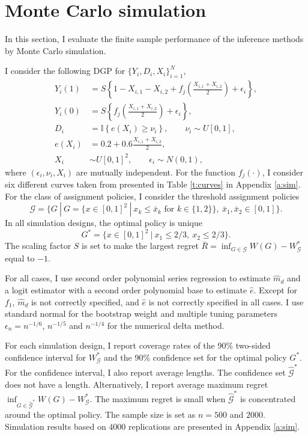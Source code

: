 \documentclass[12pt,oneside,reqno,english]{amsart}
\theoremstyle{definition}
\begin{document}
\section{Monte Carlo simulation}\label{sim}
In this section, I evaluate the finite sample performance of the inference methods by Monte Carlo simulation. 

I consider the following DGP for $\{Y_{i},D_{i},X_{i}\}_{i=1}^{N}$, 
\begin{align*}
Y_{i}(1) & =  S\left\{1-X_{i,1}-X_{i,2}+f_{j}\left(\frac{X_{i,1}+X_{i,2}}{2} \right)+\epsilon_{i}\right\},\\
Y_{i}(0) &=   S\left\{f_{j}\left(\frac{X_{i,1}+X_{i,2}}{2} \right)+\epsilon_{i}\right\},\\
D_{i} & =  \mathbb{I}\left\{e\left(X_{i} \right)\geq\nu_{i}\right\},\qquad \nu_{i}\sim U[0,1],\\
e(X_{i}) & =  0.2+0.6\frac{X_{i,1}+X_{i,2}}{2},\\
X_{i} & \sim  U[0,1]^{2},\qquad \epsilon_{i}\sim N(0,1),
\end{align*}
where $(\epsilon_{i},\nu_{i},X_{i})$ are mutually independent. For the function $f_{j}(\cdot)$, I consider six different curves taken from \cite{Frolich:04} 
presented in Table \ref{t:curves} in Appendix \ref{a:sim}. 
For the class of assignment policies, I consider the threshold assignment policies
\[\mathcal{G}=\{G\ |\ G=\{x\in [0,1]^{2} \ | \ x_{k}\leq \bar{x}_{k}\mbox{ for } k\in \{1,2\}  \},\ \bar{x}_{1},\bar{x}_{2}\in [0,1] \}.\]
In all simulation designs, the optimal policy is unique 
\[G^{*}=\{x\in [0,1]^{2}\ | \  x_{1}\leq 2/3,\ x_{2}\leq 2/3\}.\]
The scaling factor $S$ is set to make the largest regret $\bar{R}=\inf_{G\in \mathcal{G}}W(G)-W^{*}_{\mathcal{G}}$
equal to $-1$.  

For all cases, I use second order polynomial series regression to estimate $\hat{m}_{d}$ and a logit
estimator with a second order polynomial base to estimate $\hat{e}$. 
Except for $f_{1}$, $\hat{m}_{d}$ is not correctly specified, and $\hat{e}$ is not correctly specified in all cases.
I use standard normal for the bootstrap weight and multiple tuning parameters $\epsilon_{n}=n^{-1/6}$, $n^{-1/5}$ and $n^{-1/4}$ for the numerical delta method. 

For each simulation design, I report coverage rates of the 90\% two-sided confidence interval for $W^{*}_{\mathcal{G}}$ 
and the 90\%  confidence set for the optimal policy $G^{*}$. For the confidence interval, I also report average lengths. The confidence set $\hat{\mathcal{G}}^{*}$ does not have a length. Alternatively, I report average maximum regret 
$\inf_{G\in \hat{\mathcal{G}}^{*}}W(G)-W^{*}_{\mathcal{G}}$. The maximum regret is small when $\hat{\mathcal{G}}^{*}$ is concentrated 
around the optimal policy. 
The sample size is set as $n=500$ and $2000$. Simulation results based on $4000$ replications are presented in Appendix \ref{a:sim}.
\end{document}
